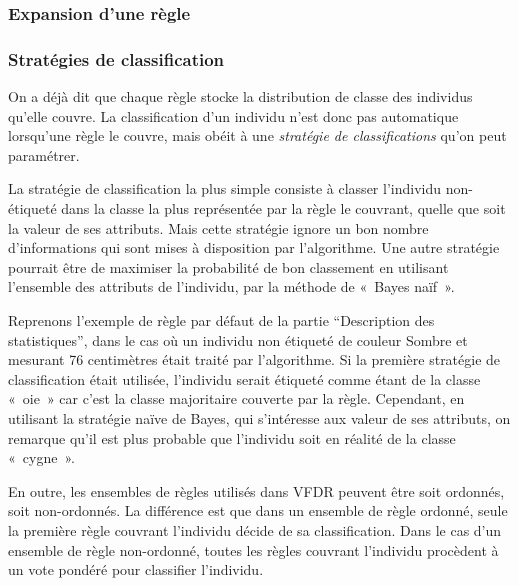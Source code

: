         \subsubsection{Expansion d'une règle}
        
        \subsubsection{Stratégies de classification}\label{ssec:nondecisional}
            On a déjà dit que chaque règle stocke la distribution de classe des individus qu'elle couvre. La classification d'un individu n'est donc pas automatique lorsqu'une règle le couvre, mais obéit à une \emph{stratégie de classifications} qu'on peut paramétrer.

            La stratégie de classification la plus simple consiste à classer l’individu non-étiqueté dans la classe la plus représentée par la règle le couvrant, quelle que soit la valeur de ses attributs. Mais cette stratégie ignore un bon nombre d’informations qui sont mises à disposition par l’algorithme. Une autre stratégie pourrait être de maximiser la probabilité de bon classement en utilisant l’ensemble des attributs de l’individu, par la méthode de «~Bayes naïf~».\cite{Gama-VFDR}
            
            Reprenons l’exemple de règle par défaut de la partie “Description des statistiques”, dans le cas où un individu non étiqueté de couleur Sombre et mesurant 76 centimètres était traité par l’algorithme. Si la première stratégie de classification était utilisée, l’individu serait étiqueté comme étant de la classe «~oie~» car c’est la classe majoritaire couverte par la règle. Cependant, en utilisant la stratégie naïve de Bayes, qui s'intéresse aux valeur de ses attributs, on remarque qu’il est plus probable que l’individu soit en réalité de la classe «~cygne~». 

            En outre, les ensembles de règles utilisés dans VFDR peuvent être soit ordonnés, soit non-ordonnés. La différence est que dans un ensemble de règle ordonné, seule la première règle couvrant l’individu décide de sa classification. Dans le cas d’un ensemble de règle non-ordonné, toutes les règles couvrant l’individu procèdent à un vote pondéré pour classifier l’individu.





